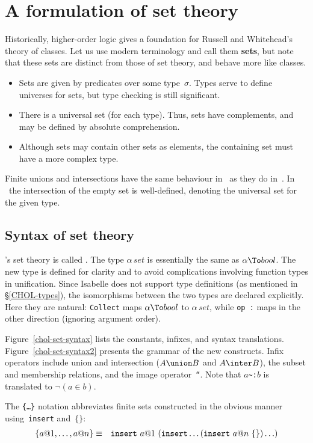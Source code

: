 \section{A formulation of set theory}
Historically, higher-order logic gives a foundation for Russell and
Whitehead's theory of classes.  Let us use modern terminology and call them
{\bf sets}, but note that these sets are distinct from those of {\ZF} set
theory, and behave more like {\ZF} classes.
\begin{itemize}
\item
Sets are given by predicates over some type~$\sigma$.  Types serve to
define universes for sets, but type checking is still significant.
\item
There is a universal set (for each type).  Thus, sets have complements, and
may be defined by absolute comprehension.
\item
Although sets may contain other sets as elements, the containing set must
have a more complex type.
\end{itemize}
Finite unions and intersections have the same behaviour in \CHOL\ as they
do in~{\ZF}.  In \CHOL\ the intersection of the empty set is well-defined,
denoting the universal set for the given type.


\subsection{Syntax of set theory}
\CHOL's set theory is called .  The type $\alpha\,set$ is
essentially the same as $\alpha\To bool$.  The new type is defined for
clarity and to avoid complications involving function types in unification.
Since Isabelle does not support type definitions (as mentioned in
\S\ref{CHOL-types}), the isomorphisms between the two types are declared
explicitly.  Here they are natural: {\tt Collect} maps $\alpha\To bool$ to
$\alpha\,set$, while \hbox{\tt op :} maps in the other direction (ignoring
argument order).

Figure~\ref{chol-set-syntax} lists the constants, infixes, and syntax
translations.  Figure~\ref{chol-set-syntax2} presents the grammar of the new
constructs.  Infix operators include union and intersection ($A\union B$
and $A\inter B$), the subset and membership relations, and the image
operator~{\tt``}\@.  Note that $a$\verb|~:|$b$ is translated to
$\neg(a\in b)$.  

The {\tt\{\ldots\}} notation abbreviates finite sets constructed in the
obvious manner using~{\tt insert} and~$\{\}$:
\begin{eqnarray*}
  \{a@1, \ldots, a@n\}  & \equiv &  
  {\tt insert}~a@1~({\tt insert}\ldots({\tt insert}~a@n~\{\})\ldots)
\end{eqnarray*}

